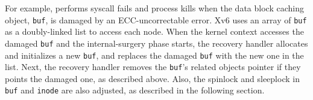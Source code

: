 For example, {\sysname} performs syscall fails and process kills when the data block caching object, \texttt{buf}, is damaged by an ECC-uncorrectable error. Xv6 uses an array of \texttt{buf} as a doubly-linked list to access each node. When the kernel context accesses the damaged \texttt{buf} and the internal-surgery phase starts, the recovery handler allocates and initializes a new \texttt{buf}, and replaces the damaged \texttt{buf} with the new one in the list. Next, the recovery handler removes the \texttt{buf}'s related objects pointer if they points the damaged one, as described above.
Also, the spinlock and sleeplock in \texttt{buf} and \texttt{inode} are also adjusted, as described in the following section.


